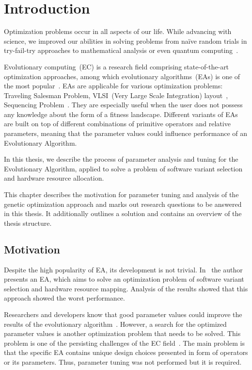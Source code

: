 \chapter{Introduction}\label{intro}

Optimization problems occur in all aspects of our life.  While advancing with science, we improved our abilities in solving problems from naïve random trials in try-fail-try approaches to mathematical analysis or even quantum computing~\cite{hogg2000quantum}.

Evolutionary computing~(EC) is a research field comprising state-of-the-art optimization approaches, among which evolutionary algorithms~(EAs) is one of the most popular~\cite{vikhar16}. EAs are applicable for various optimization problems: Traveling Salesman Problem\cite{carter2006new}, VLSI~(Very Large Scale Integration) layout~\cite{shahookar1990genetic}, Sequencing Problem~\cite{gockel1997influencing}. They are especially useful when the user does not possess any knowledge about the form of a fitness landscape. Different variants of EAs are built on top of different combinations of primitive operators and relative parameters, meaning that the parameter values could influence performance of an Evolutionary Algorithm. 

In this thesis, we describe the process of parameter analysis and tuning for the Evolutionary Algorithm, applied to solve a problem of software variant selection and hardware resource allocation.


This chapter describes the motivation for parameter tuning and analysis of the genetic optimization approach and marks out research questions to be answered in this thesis. It additionally outlines a solution and contains an overview of the thesis structure.

\section{Motivation}

Despite the high popularity of EA, its development is not trivial.
In~\cite{ahmad18} the author presents an EA, which aims to solve an optimization problem of software variant selection and hardware resource mapping. Analysis of the results showed that this approach showed the worst performance.


Researchers and developers know that good parameter values could improve the results of the evolutionary algorithm~\cite{eiben03}. However, a search for the optimized parameter values is another optimization problem that needs to be solved. This problem is one of the persisting challenges of the EC field~\cite{smit2010parameter}. The main problem is that the specific EA contains unique design choices presented in form of operators or its parameters.  Thus, parameter tuning was not performed but it is required.

